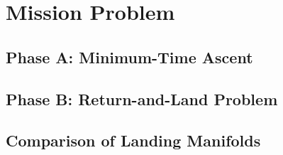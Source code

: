 \section{Mission Problem}
\label{sec:part3_mission}


\subsection{Phase A: Minimum-Time Ascent}
\label{subsec:phase_a_ascent}


\subsection{Phase B: Return-and-Land Problem}
\label{subsec:phase_b_landing}


\subsection{Comparison of Landing Manifolds}
\label{subsec:landing_manifold_comparison}

